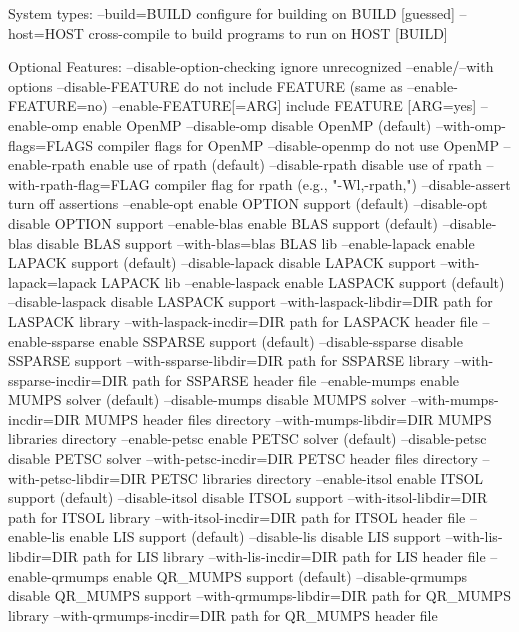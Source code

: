 \begin{evb}
System types:
  --build=BUILD     configure for building on BUILD [guessed]
  --host=HOST       cross-compile to build programs to run on HOST [BUILD]

Optional Features:
  --disable-option-checking  ignore unrecognized --enable/--with options
  --disable-FEATURE       do not include FEATURE (same as --enable-FEATURE=no)
  --enable-FEATURE[=ARG]  include FEATURE [ARG=yes]
  --enable-omp           enable OpenMP
  --disable-omp          disable OpenMP (default)
  --with-omp-flags=FLAGS compiler flags for OpenMP
  --disable-openmp        do not use OpenMP
  --enable-rpath          enable use of rpath (default)
  --disable-rpath         disable use of rpath
  --with-rpath-flag=FLAG  compiler flag for rpath (e.g., "-Wl,-rpath,")
  --disable-assert        turn off assertions
  --enable-opt         enable OPTION support (default)
  --disable-opt        disable OPTION support
  --enable-blas         enable BLAS support (default)
  --disable-blas        disable BLAS support
  --with-blas=blas BLAS lib
  --enable-lapack         enable LAPACK support (default)
  --disable-lapack        disable LAPACK support
  --with-lapack=lapack LAPACK lib
  --enable-laspack      enable LASPACK support (default)
  --disable-laspack     disable LASPACK support
  --with-laspack-libdir=DIR path for LASPACK library
  --with-laspack-incdir=DIR path for LASPACK header file
  --enable-ssparse      enable SSPARSE support (default)
  --disable-ssparse     disable SSPARSE support
  --with-ssparse-libdir=DIR path for SSPARSE library
  --with-ssparse-incdir=DIR path for SSPARSE header file
  --enable-mumps        enable MUMPS solver (default)
  --disable-mumps       disable MUMPS solver
  --with-mumps-incdir=DIR MUMPS header files directory
  --with-mumps-libdir=DIR MUMPS libraries directory
  --enable-petsc        enable PETSC solver (default)
  --disable-petsc       disable PETSC solver
  --with-petsc-incdir=DIR PETSC header files directory
  --with-petsc-libdir=DIR PETSC libraries directory
  --enable-itsol      enable ITSOL support (default)
  --disable-itsol     disable ITSOL support
  --with-itsol-libdir=DIR path for ITSOL library
  --with-itsol-incdir=DIR path for ITSOL header file
  --enable-lis      enable LIS support (default)
  --disable-lis     disable LIS support
  --with-lis-libdir=DIR path for LIS library
  --with-lis-incdir=DIR path for LIS header file
  --enable-qrmumps      enable QR_MUMPS support (default)
  --disable-qrmumps     disable QR_MUMPS support
  --with-qrmumps-libdir=DIR path for QR_MUMPS library
  --with-qrmumps-incdir=DIR path for QR_MUMPS header file

\end{evb}

